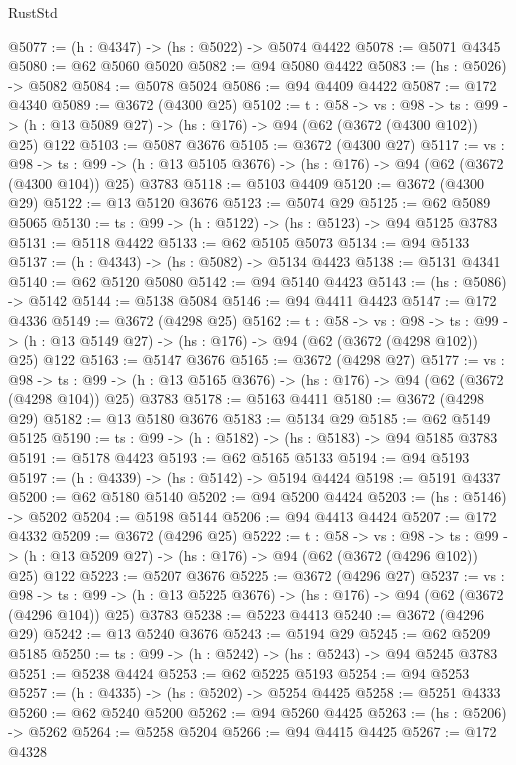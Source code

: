 \begin{lexlean}{RustStd}
\begin{coremodule}
{\begin{coremodule}
{{{{{{{{{@5077 := (h : @4347) -> (hs : @5022) -> @5074 @4422
@5078 := @5071 @4345
@5080 := @62 @5060 @5020
@5082 := @94 @5080 @4422
@5083 := (hs : @5026) -> @5082
@5084 := @5078 @5024
@5086 := @94 @4409 @4422
@5087 := @172 @4340
@5089 := @3672 (@4300 @25)
@5102 := {t : @58} ->
  {vs : @98} ->
  {ts : @99} -> (h : @13 @5089 @27) -> (hs : @176) -> @94 (@62 (@3672 (@4300 @102)) @25) @122
@5103 := @5087 @3676
@5105 := @3672 (@4300 @27)
@5117 := {vs : @98} ->
  {ts : @99} -> (h : @13 @5105 @3676) -> (hs : @176) -> @94 (@62 (@3672 (@4300 @104)) @25) @3783
@5118 := @5103 @4409
@5120 := @3672 (@4300 @29)
@5122 := @13 @5120 @3676
@5123 := @5074 @29
@5125 := @62 @5089 @5065
@5130 := {ts : @99} -> (h : @5122) -> (hs : @5123) -> @94 @5125 @3783
@5131 := @5118 @4422
@5133 := @62 @5105 @5073
@5134 := @94 @5133
@5137 := (h : @4343) -> (hs : @5082) -> @5134 @4423
@5138 := @5131 @4341
@5140 := @62 @5120 @5080
@5142 := @94 @5140 @4423
@5143 := (hs : @5086) -> @5142
@5144 := @5138 @5084
@5146 := @94 @4411 @4423
@5147 := @172 @4336
@5149 := @3672 (@4298 @25)
@5162 := {t : @58} ->
  {vs : @98} ->
  {ts : @99} -> (h : @13 @5149 @27) -> (hs : @176) -> @94 (@62 (@3672 (@4298 @102)) @25) @122
@5163 := @5147 @3676
@5165 := @3672 (@4298 @27)
@5177 := {vs : @98} ->
  {ts : @99} -> (h : @13 @5165 @3676) -> (hs : @176) -> @94 (@62 (@3672 (@4298 @104)) @25) @3783
@5178 := @5163 @4411
@5180 := @3672 (@4298 @29)
@5182 := @13 @5180 @3676
@5183 := @5134 @29
@5185 := @62 @5149 @5125
@5190 := {ts : @99} -> (h : @5182) -> (hs : @5183) -> @94 @5185 @3783
@5191 := @5178 @4423
@5193 := @62 @5165 @5133
@5194 := @94 @5193
@5197 := (h : @4339) -> (hs : @5142) -> @5194 @4424
@5198 := @5191 @4337
@5200 := @62 @5180 @5140
@5202 := @94 @5200 @4424
@5203 := (hs : @5146) -> @5202
@5204 := @5198 @5144
@5206 := @94 @4413 @4424
@5207 := @172 @4332
@5209 := @3672 (@4296 @25)
@5222 := {t : @58} ->
  {vs : @98} ->
  {ts : @99} -> (h : @13 @5209 @27) -> (hs : @176) -> @94 (@62 (@3672 (@4296 @102)) @25) @122
@5223 := @5207 @3676
@5225 := @3672 (@4296 @27)
@5237 := {vs : @98} ->
  {ts : @99} -> (h : @13 @5225 @3676) -> (hs : @176) -> @94 (@62 (@3672 (@4296 @104)) @25) @3783
@5238 := @5223 @4413
@5240 := @3672 (@4296 @29)
@5242 := @13 @5240 @3676
@5243 := @5194 @29
@5245 := @62 @5209 @5185
@5250 := {ts : @99} -> (h : @5242) -> (hs : @5243) -> @94 @5245 @3783
@5251 := @5238 @4424
@5253 := @62 @5225 @5193
@5254 := @94 @5253
@5257 := (h : @4335) -> (hs : @5202) -> @5254 @4425
@5258 := @5251 @4333
@5260 := @62 @5240 @5200
@5262 := @94 @5260 @4425
@5263 := (hs : @5206) -> @5262
@5264 := @5258 @5204
@5266 := @94 @4415 @4425
@5267 := @172 @4328
}}}}}}}}}
\end{coremodule}}
\end{coremodule}
\end{lexlean}
